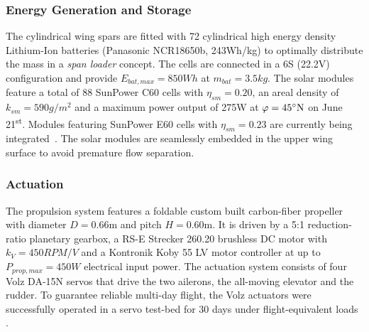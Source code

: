 \subsubsection{Energy Generation and Storage}
The cylindrical wing spars are fitted with 72 cylindrical high energy density Lithium-Ion batteries (Panasonic NCR18650b, 243Wh/kg) to optimally distribute the mass in a \textit{span loader} concept. The cells are connected in a 6S (22.2V) configuration and provide $E_{bat,max}=850Wh$ at $m_{bat}=3.5kg$. The solar modules feature a total of 88 SunPower C60 cells with $\eta_{sm}=0.20$, an areal density of $k_{sm}=590g/m^2$ and a maximum power output of 275W at $\varphi=45\degree \textrm{N}$ on June 21\textsuperscript{st}. Modules featuring SunPower E60 cells with $\eta_{sm}=0.23$ are currently being integrated~\cite{Sunier_EPFLSolarModules}. The solar modules are seamlessly embedded in the upper wing surface to avoid premature flow separation.

\subsubsection{Actuation}
The propulsion system features a foldable custom built carbon-fiber propeller with diameter $D=0.66\textrm{m}$ and pitch $H=0.60\textrm{m}$. It is driven by a 5:1 reduction-ratio planetary gearbox, a RS-E Strecker 260.20 brushless DC motor with $k_V=450RPM/V$ and a Kontronik Koby 55 LV motor controller at up to $P_{prop,max}=450W$ electrical input power. The actuation system consists of four Volz DA-15N servos that drive the two ailerons, the all-moving elevator and the rudder. To guarantee reliable multi-day flight, the Volz actuators were successfully operated in a servo test-bed for 30 days under flight-equivalent loads \cite{DellaCa_BT}.

